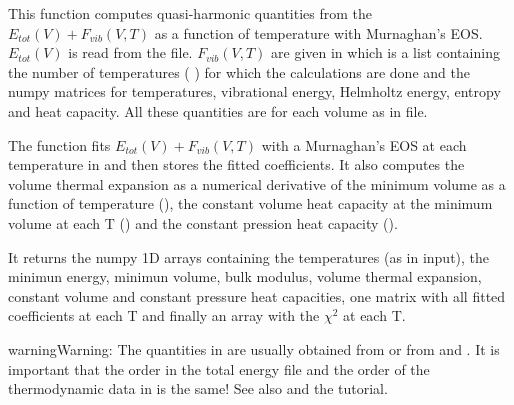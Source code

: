 \documentclass[letterpaper,10pt,english]{sphinxmanual}
\begin{document}

\begin{fulllineitems}
\label{pyqha:pyqha.fitFvib.fitFvibV}
This function computes quasi-harmonic quantities from the 
\(E_{tot}(V)+F_{vib}(V,T)\) as a function of temperature with Murnaghan's
EOS. \(E_{tot}(V)\) is read from the  file. \(F_{vib}(V,T)\)
are given in  which is a list containing the number of temperatures
(  ) for which the calculations are done and the numpy matrices for 
temperatures, vibrational energy, Helmholtz energy, entropy and
heat capacity. All these quantities are for each volume as in  file.

The function fits \(E_{tot}(V)+F_{vib}(V,T)\) with a Murnaghan's EOS
at each temperature in  and then stores the fitted coefficients.
It also computes the volume thermal expansion as a numerical derivative of
the minimum volume as a function of temperature (), the
constant volume heat capacity at the minimum volume at each T
() and the constant pression heat capacity ().

It returns the numpy 1D arrays containing the temperatures (as in input), the
minimun energy, minimun volume, bulk modulus, volume thermal expansion, constant
volume and constant pressure heat capacities, one matrix with all fitted 
coefficients at each T and finally an array with the \(\chi^2\) at each T.

\begin{sphinxadmonition}{warning}{Warning:}
The quantities in  are usually obtained from 
or from  and . It is
important that the order in the total energy file  and the order of
the thermodynamic data in  is the same!  See also  and 
the tutorial.
\end{sphinxadmonition}

\end{fulllineitems}

\label{pyqha:module-pyqha.fitC}
\end{document}

